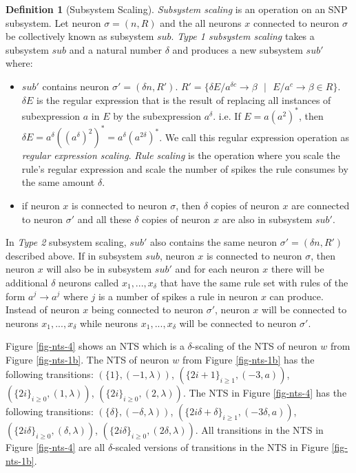 \documentclass[]{elsarticle}
\theoremstyle{definition}
\newtheorem{definition2}{Definition}
\theoremstyle{definition}
\newcommand{\ra}{\rightarrow}
\newcommand{\se}{\text{ }}
\begin{document}
\begin{definition2}[Subsystem Scaling]
\emph{Subsystem scaling} is an operation on an SNP subsystem. Let neuron $\sigma=(n,R)$ and the all 
neurons $x$ connected to neuron $\sigma$ be collectively known as subsystem $sub$. \emph{Type 1 
subsystem scaling} takes a subsystem $sub$ and a natural number $\delta$ and produces a new 
subsystem $sub'$ where:
\begin{itemize}
   \item $sub'$ contains neuron $\sigma'=(\delta n, R')$. $R'=\{\delta E/a^{\delta c} \ra \beta\se|
         \se E/a^c\ra \beta \in R\}$. $\delta E$ is the regular expression that is the result of 
         replacing all instances of subexpression $a$ in $E$ by the subexpression $a^{\delta}$. i.e.
         If $E=a(a^2)^*$, then $\delta E = a^{\delta}((a^{\delta})^2)^* = a^{\delta}(a^{2\delta})^*$.
         We call this regular expression operation as \emph{regular expression scaling}. \emph{Rule
         scaling} is the operation where you scale the rule's regular expression and scale the
         number of spikes the rule consumes by the same amount $\delta$.
   \item if neuron $x$ is connected to neuron $\sigma$, then $\delta$ copies of neuron $x$ are
         connected to neuron $\sigma'$ and all these $\delta$ copies of neuron $x$ are also in 
         subsystem $sub'$. 
\end{itemize}

In \emph{Type 2} subsystem scaling, $sub'$ also contains the same neuron $\sigma'=(\delta n,R')$ 
described above. If in subsystem $sub$, neuron $x$ is connected to neuron $\sigma$, then neuron $x$
will also be in subsystem $sub'$ and for each neuron $x$ there will be additional $\delta$ neurons
called $x_1,..., x_{\delta}$ that have the same rule set with rules of the form $a^j\ra a^j$ where
$j$ is a number of spikes a rule in neuron $x$ can produce. Instead of  neuron $x$ being connected 
to neuron $\sigma'$, neuron $x$ will be connected to neurons $x_1,...,x_{\delta}$ while neurons 
$x_1,...,x_{\delta}$ will be connected to neuron $\sigma'$.
\end{definition2}


Figure \ref{fig-nts-4} shows an NTS which is a $\delta$-scaling of the NTS of neuron $w$ from 
Figure \ref{fig-nts-1b}. The NTS of neuron $w$ from Figure \ref{fig-nts-1b} has the following 
transitions: $(\{1\}, (-1,\lambda))$, $(\{2i+1\}_{i\geq 1},(-3,a))$,$(\{2i\}_{i\geq 0},(1,\lambda))$, 
$(\{2i\}_{i\geq 0},(2,\lambda))$. The NTS in Figure \ref{fig-nts-4} has the following transitions:
$(\{\delta\}, (-\delta,\lambda))$, $(\{2i\delta+\delta\}_{i\geq 1},(-3\delta,a))$,
$(\{2i\delta\}_{i\geq 0},(\delta,\lambda))$, $(\{2i\delta\}_{i\geq 0},(2\delta,\lambda))$. All 
transitions in the NTS in Figure \ref{fig-nts-4} are all $\delta$-scaled versions of transitions in
the NTS in Figure \ref{fig-nts-1b}.
\end{document}
